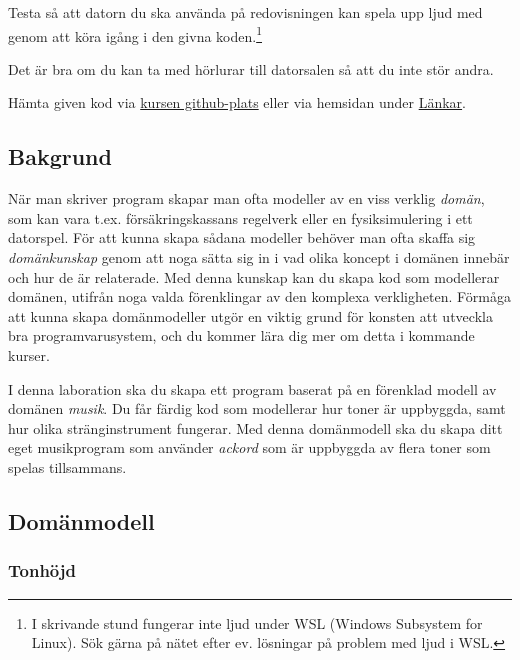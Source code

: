 


\begin{Preparations}
\item Testa så att datorn du ska använda på redovisningen kan spela upp ljud med  genom att köra igång  i den givna koden.\footnote{I skrivande stund fungerar inte ljud under WSL (Windows Subsystem for Linux). Sök gärna på nätet efter ev. lösningar på problem med ljud i WSL.}
\item Det är bra om du kan ta med hörlurar till datorsalen så att du inte stör andra.
\item Hämta given kod via \href{https://github.com/lunduniversity/introprog/tree/master/workspace/}{kursen github-plats} eller via hemsidan under \href{httphttps://lunduniversity.github.io/pgk/#l%C3%A4nkar}{Länkar}.
\end{Preparations}

\subsection{Bakgrund}
När man skriver program skapar man ofta modeller av en viss verklig \emph{domän}, som kan vara t.ex. försäkringskassans regelverk eller en fysiksimulering i ett datorspel. För att kunna skapa sådana modeller behöver man ofta skaffa sig  \emph{domänkunskap} genom att noga sätta sig in i vad olika koncept i domänen innebär och hur de är relaterade. Med denna kunskap kan du skapa kod som modellerar domänen, utifrån noga valda förenklingar av den komplexa verkligheten. Förmåga att kunna skapa domänmodeller utgör en viktig grund för konsten att utveckla bra programvarusystem, och du kommer lära dig mer om detta i kommande kurser.

I denna laboration ska du skapa ett program baserat på en förenklad modell av domänen \emph{musik}. Du får färdig kod som modellerar hur toner är uppbyggda, samt hur olika stränginstrument fungerar.
Med denna domänmodell ska du skapa ditt eget musikprogram som använder \emph{ackord} som är uppbyggda av flera toner som spelas tillsammans.

\subsection{Domänmodell}


\subsubsection{Tonhöjd}

